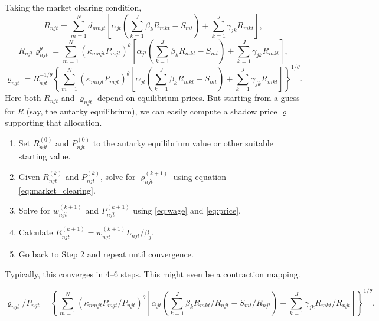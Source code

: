 \documentclass{article}
\begin{document}
Taking the market clearing condition,
\begin{equation}
	R_{njt} = \sum_{m=1}^N
		d_{mnjt}
		\left[
			\alpha_{jt}
			\left(
				\sum_{k=1}^J\beta_k R_{mkt} - S_{mt}
			\right)
			+ \sum_{k=1}^J\gamma_{jk}R_{mkt}
		\right],
\end{equation}
\[
	R_{njt}\varrho_{njt}^{\theta} = \sum_{m=1}^N
		(\kappa_{mnjt} P_{mjt})^{\theta}
		\left[
			\alpha_{jt}
			\left(
				\sum_{k=1}^J\beta_k R_{mkt} - S_{mt}
			\right)
			+ \sum_{k=1}^J\gamma_{jk}R_{mkt}
		\right],
\]
\begin{equation}\label{eq:market_clearing}
	\varrho_{njt} = R_{njt}^{-1/\theta}
	\left\{
	\sum_{m=1}^N
		(\kappa_{mnjt} P_{mjt})^{\theta}
		\left[
			\alpha_{jt}
			\left(
				\sum_{k=1}^J\beta_k R_{mkt} - S_{mt}
			\right)
			+ \sum_{k=1}^J\gamma_{jk}R_{mkt}
		\right]
	\right\}^{1/\theta}.
\end{equation}
Here both $R_{njt}$ and $\varrho_{njt}$ depend on equilibrium prices. But starting from a guess for $R$ (say, the autarky equilibrium), we can easily compute a shadow price $\varrho$ supporting that allocation. 
\begin{enumerate}
	\item Set $R_{njt}^{(0)}$ and $P_{njt}^{(0)}$ to the autarky equilibrium value or other suitable starting value.
	\item Given $R_{njt}^{(k)}$ and $P_{njt}^{(k)}$, solve for $\varrho_{njt}^{(k+1)}$ using equation \eqref{eq:market_clearing}.
	\item Solve for $w_{njt}^{(k+1)}$ and $P_{njt}^{(k+1)}$ using \eqref{eq:wage} and \eqref{eq:price}.
	\item Calculate $R_{njt}^{(k+1)} = w_{njt}^{(k+1)}L_{njt}/\beta_j$.
	\item Go back to Step 2 and repeat until convergence.
\end{enumerate}
Typically, this converges in 4--6 steps. This might even be a contraction mapping. 

\begin{equation*}
	\varrho_{njt}/P_{njt} = 
	\left\{
	\sum_{m=1}^N
		(\kappa_{nmjt} P_{mjt}/P_{njt})^{\theta}
		\left[
			\alpha_{jt}
			\left(
				\sum_{k=1}^J\beta_k R_{mkt}/R_{njt} - S_{mt}/R_{njt}
			\right)
			+ \sum_{k=1}^J\gamma_{jk}R_{mkt}/R_{njt}
		\right]
	\right\}^{1/\theta}.
\end{equation*}
\end{document}
